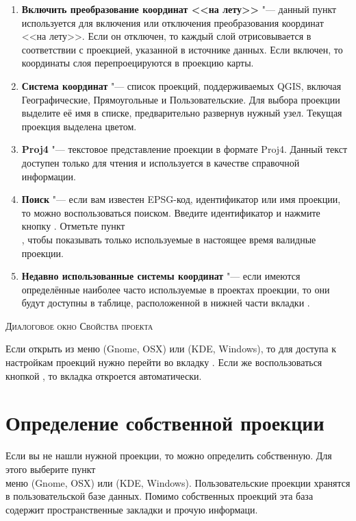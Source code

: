 \begin{enumerate}
\item \textbf{Включить преобразование координат <<на лету>>}
"--- данный пункт используется для включения или отключения преобразования
координат <<на лету>>. Если он отключен, то каждый слой отрисовывается в
соответствии с проекцией, указанной в источнике данных. Если включен, то
координаты слоя перепроецируются в проекцию карты.
\item \textbf{Система координат} "--- список проекций, поддерживаемых QGIS,
включая Географические, Прямоугольные и Пользовательские. Для выбора проекции
выделите её имя в списке, предварительно развернув нужный узел. Текущая
проекция выделена цветом.
\item \textbf{Proj4} "--- текстовое представление проекции в формате
Proj4. Данный текст доступен только для чтения и используется в
качестве справочной информации.
\item \textbf{Поиск} "--- если вам известен EPSG-код, идентификатор или имя
проекции, то можно воспользоваться поиском. Введите идентификатор и нажмите
кнопку . Отметьте пункт \\
, чтобы показывать только
используемые в настоящее время валидные проекции.
\item \textbf{Недавно использованные системы координат} "--- если имеются
определённые наиболее часто используемые в проектах проекции, то они будут
доступны в таблице, расположенной в нижней части вкладки .
\end{enumerate}

\begin{Tip}
\caption{\textsc{Диалоговое окно Свойства проекта}}
Если открыть  из меню 
(Gnome, OSX) или  (KDE, Windows), то для доступа к
настройкам проекций нужно перейти во вкладку . Если
же воспользоваться кнопкой
, то
вкладка  откроется автоматически.
\end{Tip}

\section{Определение собственной проекции}\label{sec:customprojections}

Если вы не нашли нужной проекции, то можно определить собственную. Для этого
выберите пункт \\
 меню
 (Gnome, OSX) или  (KDE,
Windows). Пользовательские проекции хранятся в пользовательской базе
данных. Помимо собственных проекций эта база содержит пространственные
закладки и прочую информаци.

